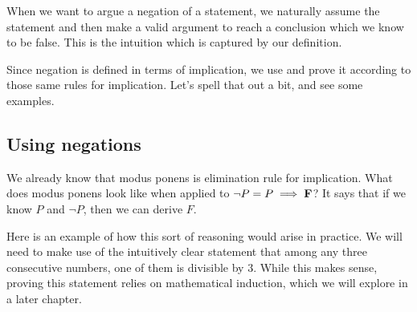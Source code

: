 When we want to argue a negation of a statement, we naturally assume the statement and then make a valid argument to reach a conclusion which we know to be false.  This is the intuition which is captured by our definition.

Since negation is defined in terms of implication, we use and prove it according to those same rules for implication.  Let's spell that out a bit, and see some examples.

\subsection{Using negations}

We already know that modus ponens is elimination rule for implication.   What does modus ponens look like when applied to $\neg P = P \implies \textbf{\textrm{F}}$?  It says that if we know $P$ and $\neg P$, then we can derive $F$.  

%
%

Here is an example of how this sort of reasoning would arise in practice.  We will need to make use of the intuitively clear statement that among any three consecutive numbers, one of them is divisible by $3$.  While this makes sense, proving this statement relies on mathematical induction, which we will explore in a later chapter.


